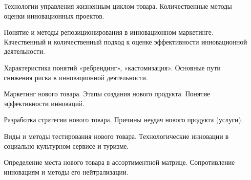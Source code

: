 \documentclass[
	14pt,
	a4paper,
	]
	{scrartcl}
\begin{document}
\vfill

\newpage


\shapk
{}
\setcounter{zad}{0}

\vfill
\z Технологии управления жизненным циклом товара.
 \vfill
\z Количественные методы оценки инновационных проектов.
 \vfill

\vfill

\newpage


\shapk
{}
\setcounter{zad}{0}

\vfill
\z Понятие и методы репозиционирования в инновационном маркетинге.
 \vfill
\z Качественный и количественный подход к оценке эффективности инновационной деятельности.
 \vfill

\vfill

\newpage


\shapk
{}
\setcounter{zad}{0}

\vfill
\z Характеристика понятий «ребрендинг», «кастомизация».
 \vfill
\z Основные пути снижения риска в инновационной деятельности.
 \vfill

\vfill

\newpage


\shapk
{}
\setcounter{zad}{0}

\vfill
\z Маркетинг нового товара. Этапы создания нового продукта.
 \vfill
\z Понятие эффективности инноваций.
 \vfill

\vfill

\newpage


\shapk
{}
\setcounter{zad}{0}

\vfill
\z Разработка стратегии нового товара.
 \vfill
\z Причины неудач нового продукта (услуги).
 \vfill

\vfill

\newpage


\shapk
{}
\setcounter{zad}{0}

\vfill
\z Виды и методы тестирования нового товара.
 \vfill
\z Технологические инновации в социально-культурном сервисе и туризме.
 \vfill

\vfill

\newpage


\shapk
{}
\setcounter{zad}{0}

\vfill
\z Определение места нового товара в ассортиментной матрице.
 \vfill
\z Сопротивление инновациям и методы его нейтрализации.
 \vfill
\end{document}
